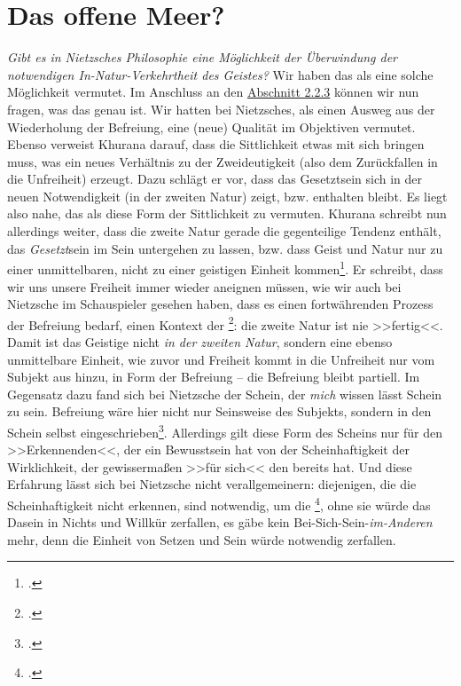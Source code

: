 \documentclass[12pt, a4paper, openany]{report}
\begin{document}
\section{Das offene Meer?}\label{abschnitt_4}
\textit{Gibt es in Nietzsches Philosophie eine Möglichkeit der Überwindung der notwendigen In-Natur-Verkehrtheit des Geistes?} 
Wir haben das  als eine solche Möglichkeit vermutet.
Im Anschluss an den \hyperref[abschnitt_2_3]{Abschnitt 2.2.3} können wir nun fragen, was das  genau ist.
Wir hatten bei Nietzsches, als einen Ausweg aus der Wiederholung der Befreiung, eine (neue) Qualität im Objektiven vermutet.
Ebenso verweist Khurana darauf, dass die Sittlichkeit etwas mit sich bringen muss, was ein neues Verhältnis zu der Zweideutigkeit (also dem Zurückfallen in die Unfreiheit) erzeugt.
Dazu schlägt er vor, dass das Gesetztsein sich in der neuen Notwendigkeit (in der zweiten Natur) zeigt, bzw. enthalten bleibt. 
Es liegt also nahe, das  als diese Form der Sittlichkeit zu vermuten. 
Khurana schreibt nun allerdings weiter, dass die zweite Natur gerade die gegenteilige Tendenz enthält, das \emph{Gesetzt}sein im Sein untergehen zu lassen, bzw. dass Geist und Natur nur zu einer unmittelbaren, nicht zu einer geistigen Einheit kommen\footcite[Vgl.][S. 401 ff]{khurana_freiheit_2017}.
Er schreibt, dass wir uns unsere Freiheit immer wieder aneignen müssen, wie wir auch bei Nietzsche im Schauspieler gesehen haben, dass es einen fortwährenden Prozess der Befreiung bedarf, einen Kontext der \footcite[][402]{khurana_freiheit_2017}: 
die zweite Natur ist nie >>fertig<<.
Damit ist das Geistige nicht \emph{in der zweiten Natur}, sondern eine ebenso unmittelbare Einheit, wie zuvor und Freiheit kommt in die Unfreiheit nur vom Subjekt aus hinzu, in Form der Befreiung -- die Befreiung bleibt partiell. 
Im Gegensatz dazu fand sich bei Nietzsche der Schein, der \emph{mich} wissen lässt Schein zu sein. 
Befreiung wäre hier nicht nur Seinsweise des Subjekts, sondern in den Schein selbst eingeschrieben\footcite[Vgl.][339]{khurana_freiheit_2017}.
Allerdings gilt diese Form des Scheins nur für den >>Erkennenden<<, der ein Bewusstsein hat von der Scheinhaftigkeit der Wirklichkeit, der gewissermaßen >>für sich<< den  bereits  hat.
Und diese Erfahrung lässt sich bei Nietzsche nicht verallgemeinern:
diejenigen, die die Scheinhaftigkeit nicht erkennen, sind notwendig, um die \footcite[][417]{nietzsche_morgenrote_1999}, ohne sie würde das Dasein in Nichts und Willkür zerfallen, es gäbe kein Bei-Sich-Sein-\emph{im-Anderen} mehr, denn die Einheit von Setzen und Sein würde notwendig zerfallen.%
\end{document}
